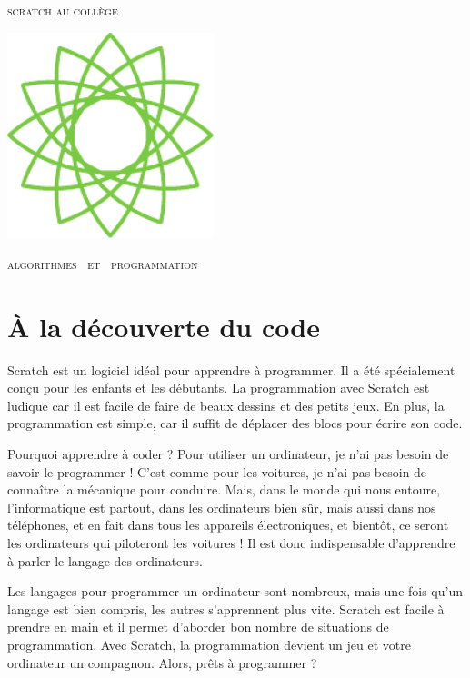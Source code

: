 
\pagestyle{empty}\thispagestyle{empty}
\vspace*{\fill}
\begin{center}
\fontsize{52}{52}\selectfont
\textsc{scratch au collège}

  \hfil
  
  \includegraphics[width = 6cm]{logoScratchAuCollege}
\end{center}
\vfill
\begin{center}
\huge
\textsc{algorithmes \  et \  programmation}
\end{center}
\begin{center}
\end{center}
\clearpage

\thispagestyle{empty}

\vspace*{\fill}
\section*{À la découverte du code}

Scratch est un logiciel idéal pour apprendre à programmer. Il a été spécialement conçu pour les enfants et les débutants. La programmation avec Scratch est ludique car il est facile de faire de beaux dessins et des petits jeux. En plus, la programmation est simple, car il suffit de déplacer des blocs pour écrire son code.

\bigskip 

Pourquoi apprendre à coder ? Pour utiliser un ordinateur, je n'ai pas besoin de savoir le programmer ! C'est comme pour les voitures, je n'ai pas besoin de connaître la mécanique pour conduire. Mais, dans le monde qui nous entoure, l'informatique est partout, dans les ordinateurs bien sûr, mais aussi dans nos téléphones, et en fait dans tous les appareils électroniques, et bientôt, ce seront les ordinateurs qui piloteront les voitures ! Il est donc indispensable d'apprendre à parler le langage des ordinateurs. 

\bigskip

Les langages pour programmer un ordinateur sont nombreux, mais une fois qu'un langage est bien compris, les autres s'apprennent plus vite.
Scratch est facile à prendre en main et il permet d'aborder bon nombre de situations de programmation. %
Avec Scratch, la programmation devient un jeu et votre ordinateur un compagnon.
Alors, prêts à programmer ?

\vspace*{\fill}

\thispagestyle{empty}
\tableofcontents
